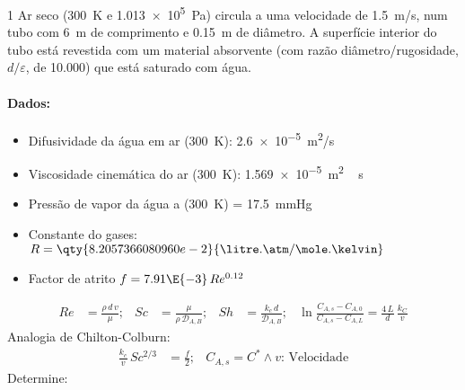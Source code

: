 \documentclass[\mainfilename]{subfiles}
\begin{document}
\begin{questionBox}1{ %
    Ar seco (\qty*{300}{\K} e \qty*{1.013e5}{\Pa}) circula a uma velocidade de \qty*{1.5}{\m/\s}, num tubo com \qty*{6}{\m} de comprimento e \qty*{0.15}{\m} de diâmetro. A superfície interior do tubo está revestida com um material absorvente (com razão diâmetro/rugosidade, \(d/\varepsilon\), de \num*{10.000}) que está saturado com água.
} %
    \paragraph*{Dados:}
    \begin{itemize}
        \item Difusividade da água em ar (\qty*{300}{\K}): \qty*{2.6e-5}{\m^2/\s}
        \item Viscosidade cinemática do ar (\qty*{300}{\K}): \qty*{1.569e-5}{\m^2\,s}
        \item Pressão de vapor da água a (\qty*{300}{\K}) = \qty*{17.5}{\mmHg}
        \item Constante do gases: \(R=\qty{8.2057366080960e-2}{\litre.\atm/\mole.\kelvin}\)
        \item Factor de atrito \(f = 7.91\E{-3}\,Re^{0.12}\)
    \end{itemize}
    \begin{align*}
        Re&=\frac{\rho\,d\,v}{\mu}
        ;& 
        Sc&=\frac{\mu}{\rho\,\mathscr{D}_{A,B}}
        ;&
        Sh&=\frac{k_c\,d}{\mathscr{D}_{A,B}}
        ;&
        \ln{\frac
            {C_{A,s}-C_{A,0}}
            {C_{A,s}-C_{A,L}}
        } =\frac{4\,L}{d}
        \,\frac{k_C}{v}
    \end{align*}
    Analogia de Chilton-Colburn:
    \begin{align*}
        \frac{k_c}{v}
        \,Sc^{2/3}
        &=\frac{f}{2}
        ;&
        C_{A,s}=C^*
        \land
        v\text{: Velocidade}
    \end{align*}
    Determine:
\end{questionBox}
\end{document}
